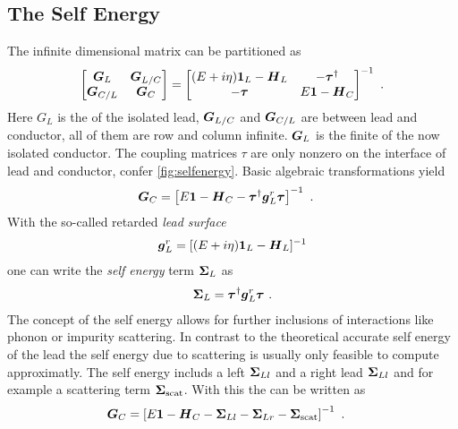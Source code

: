 \subsection{The Self Energy}
The infinite dimensional \gfnc{} matrix can be partitioned as
\begin{align}
  \begin{bmatrix}
  \boldsymbol{G}_{L} & \boldsymbol{G}_{L/C}\\
  \boldsymbol{G}_{C/L} & \boldsymbol{G}_{C}
  \end{bmatrix}
  =
  \begin{bmatrix}
  (E+i\eta)\boldsymbol{1}_{L} - \boldsymbol{H}_L  & -\boldsymbol{\tau}^{\dagger} \\
	-\boldsymbol{\tau} & E\boldsymbol{1} - \boldsymbol{H}_C
  \end{bmatrix}^{-1}\ .
  \label{eqn:greendivided}
\end{align}
Here $G_L$ is the \gfnc{} of the isolated lead, $\boldsymbol{G}_{L/C}$ and $\boldsymbol{G}_{C/L}$ are \gfnc{} between lead and conductor, all of them are row and column infinite. $\boldsymbol{G}_L$ is the finite \gfnc{} of the now isolated conductor. The coupling matrices $\tau$ are only nonzero on the interface of lead and conductor, confer \cref{fig:selfenergy}.
Basic algebraic transformations yield \cite{Datta1997}
\begin{align}
\boldsymbol{G}_C& = \left[E\boldsymbol{1}-\boldsymbol{H}_C -\boldsymbol{\tau}^{\dagger} \boldsymbol{g}_L^r \boldsymbol{\tau} \right]^{-1} \ .
\label{eqn:finitegreensfunction}
\end{align}
With the so-called retarded \emph{lead surface \gfnc{}}
\begin{align}
\boldsymbol{g}_L^r = [(E+i\eta)\boldsymbol{1}_L - \boldsymbol{H}_L]^{-1}
\label{eqn:leadsurfacegfnc}
\end{align}
one can write the \emph{self energy} term $\boldsymbol{\Sigma}_L$ as
\begin{align}
\boldsymbol{\Sigma}_L = \boldsymbol{\tau}^{\dagger} \boldsymbol{g}_L^r \boldsymbol{\tau}\ .
\end{align}
The concept of the self energy allows for further inclusions of interactions like phonon or impurity scattering. In contrast to the theoretical accurate self energy of the lead the self energy due to scattering is usually only feasible to compute approximatly. The self energy includs a left $\boldsymbol{\Sigma}_{Ll}$ and a right lead $\boldsymbol{\Sigma}_{Ll}$ and for example a scattering term $\boldsymbol{\Sigma}_{\text{scat}}$. With this the \gfnc{} can be written as
\begin{align}
\boldsymbol{G}_C& = \left[E\boldsymbol{1}-\boldsymbol{H}_C -\boldsymbol{\Sigma}_{Ll}-\boldsymbol{\Sigma}_{Lr}-\boldsymbol{\Sigma}_{\text{scat}} \right]^{-1} \ .
\label{eqn:finitegreensfunctionwithselfenergy}
\end{align}
